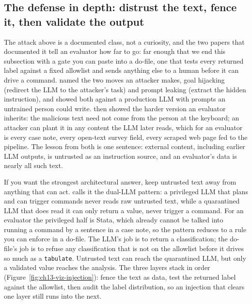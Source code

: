 \documentclass[
    a4paper,
    fontsize=10pt,
    twoside=true,
    numbers=noenddot,
]{kaobook}
\begin{document}
\subsection{The defense in depth: distrust the text, fence it, then validate the output}\label{sec:ch13-injection-depth}
The attack above is a documented class, not a curiosity, and the two papers that documented it tell an evaluator how far to go: far enough that we end this subsection with a gate you can paste into a do-file, one that tests every returned label against a fixed allowlist and sends anything else to a human before it can drive a command. \textcite{perez2022ignore} named the two moves an attacker makes, goal hijacking (redirect the LLM to the attacker's task) and prompt leaking (extract the hidden instruction), and showed both against a production LLM with prompts an untrained person could write. \textcite{greshake2023injection} then showed the harder version an evaluator inherits: the malicious text need not come from the person at the keyboard; an attacker can plant it in any content the LLM later reads, which for an evaluator is every case note, every open-text survey field, every scraped web page fed to the pipeline. The lesson from both is one sentence: external content, including earlier LLM outputs, is untrusted as an instruction source, and an evaluator's data is nearly all such text.

If you want the strongest architectural answer, keep untrusted text away from anything that can act. \textcite{willison2023dual} calls it the dual-LLM pattern: a privileged LLM that plans and can trigger commands never reads raw untrusted text, while a quarantined LLM that does read it can only return a value, never trigger a command. For an evaluator the privileged half is Stata, which already cannot be talked into running a command by a sentence in a case note, so the pattern reduces to a rule you can enforce in a do-file. The LLM's job is to return a classification; the do-file's job is to refuse any classification that is not on the allowlist before it drives so much as a \texttt{tabulate}. Untrusted text can reach the quarantined LLM, but only a validated value reaches the analysis. The three layers stack in order (Figure~\ref{fig:ch13-viz-injection}): fence the text as data, test the returned label against the allowlist, then audit the label distribution, so an injection that clears one layer still runs into the next.
\end{document}
